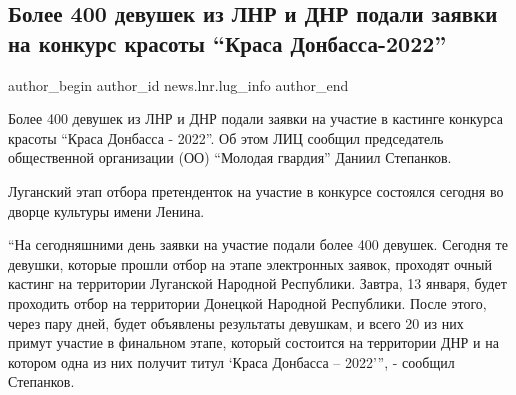  
 
 
 
 
 
\subsection{Более 400 девушек из ЛНР и ДНР подали заявки на конкурс красоты \enquote{Краса Донбасса-2022}}
\label{sec:12_02_2022.stz.news.lnr.lug_info.1.krasa_donbassa_2022}
 
\ifcmt
 author_begin
   author_id news.lnr.lug_info
 author_end
\fi

Более 400 девушек из ЛНР и ДНР подали заявки на участие в кастинге конкурса
красоты \enquote{Краса Донбасса - 2022}. Об этом ЛИЦ сообщил председатель общественной
организации (ОО) \enquote{Молодая гвардия} Даниил Степанков.


Луганский этап отбора претенденток на участие в конкурсе состоялся сегодня во
дворце культуры имени Ленина.


\enquote{На сегодняшними день заявки на участие подали более 400 девушек. Сегодня те
девушки, которые прошли отбор на этапе электронных заявок, проходят очный
кастинг на территории Луганской Народной Республики. Завтра, 13 января, будет
проходить отбор на территории Донецкой Народной Республики. После этого, через
пару дней, будет объявлены результаты девушкам, и всего 20 из них примут
участие в финальном этапе, который состоится на территории ДНР и на котором
одна из них получит титул \enquote{Краса Донбасса – 2022}}, - сообщил Степанков.


